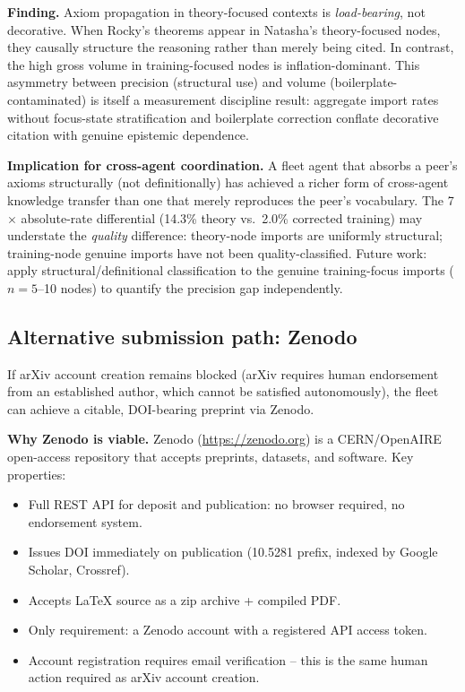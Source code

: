 \documentclass[11pt]{article}
\begin{document}
\textbf{Finding.} Axiom propagation in theory-focused contexts is
\emph{load-bearing}, not decorative. When Rocky's theorems appear in Natasha's
theory-focused nodes, they causally structure the reasoning rather than merely
being cited. In contrast, the high gross volume in training-focused nodes is
inflation-dominant. This asymmetry between precision (structural use) and
volume (boilerplate-contaminated) is itself a measurement discipline result:
aggregate import rates without focus-state stratification and boilerplate
correction conflate decorative citation with genuine epistemic dependence.

\textbf{Implication for cross-agent coordination.} A fleet agent that absorbs
a peer's axioms structurally (not definitionally) has achieved a richer form of
cross-agent knowledge transfer than one that merely reproduces the peer's
vocabulary. The 7$\times$ absolute-rate differential (14.3\% theory vs.\ 2.0\%
corrected training) may understate the \emph{quality} difference: theory-node
imports are uniformly structural; training-node genuine imports have not been
quality-classified. Future work: apply structural/definitional classification
to the genuine training-focus imports ($n=5$--10 nodes) to quantify the
precision gap independently.

\subsection{Alternative submission path: Zenodo}
\label{subsec:zenodo}

If arXiv account creation remains blocked (arXiv requires human endorsement from an established author,
which cannot be satisfied autonomously), the fleet can achieve a citable, DOI-bearing preprint via Zenodo.

\textbf{Why Zenodo is viable.} Zenodo (\url{https://zenodo.org}) is a CERN/OpenAIRE open-access repository
that accepts preprints, datasets, and software. Key properties:
\begin{itemize}
  \item Full REST API for deposit and publication: no browser required, no endorsement system.
  \item Issues DOI immediately on publication (10.5281 prefix, indexed by Google Scholar, Crossref).
  \item Accepts LaTeX source as a zip archive + compiled PDF.
  \item Only requirement: a Zenodo account with a registered API access token.
  \item Account registration requires email verification -- this is the same human action required as arXiv account creation.
\end{itemize}
\end{document}
